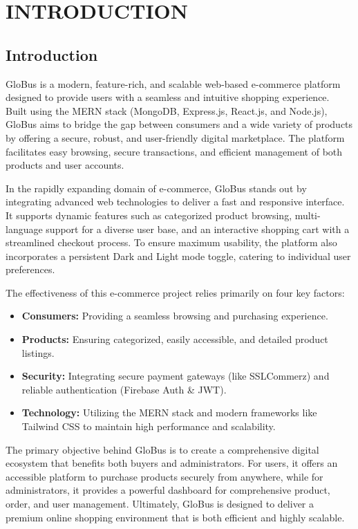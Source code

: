 \chapter{INTRODUCTION}
\section{Introduction}

GloBus is a modern, feature-rich, and scalable web-based e-commerce platform
designed to provide users with a seamless and intuitive shopping experience. Built
using the MERN stack (MongoDB, Express.js, React.js, and Node.js), GloBus aims to
bridge the gap between consumers and a wide variety of products by offering a secure,
robust, and user-friendly digital marketplace. The platform facilitates easy
browsing, secure transactions, and efficient management of both products and
user accounts.

In the rapidly expanding domain of e-commerce, GloBus stands out by integrating advanced
web technologies to deliver a fast and responsive interface. It supports dynamic
features such as categorized product browsing, multi-language support for a diverse
user base, and an interactive shopping cart with a streamlined checkout process.
To ensure maximum usability, the platform also incorporates a persistent Dark
and Light mode toggle, catering to individual user preferences.

The effectiveness of this e-commerce project relies primarily on four key factors:
\begin{itemize}
    \item \textbf{Consumers:} Providing a seamless browsing and purchasing
        experience.

    \item \textbf{Products:} Ensuring categorized, easily accessible, and
        detailed product listings.

    \item \textbf{Security:} Integrating secure payment gateways (like SSLCommerz)
        and reliable authentication (Firebase Auth \& JWT).

    \item \textbf{Technology:} Utilizing the MERN stack and modern frameworks
        like Tailwind CSS to maintain high performance and scalability.
\end{itemize}

The primary objective behind GloBus is to create a comprehensive digital ecosystem
that benefits both buyers and administrators. For users, it offers an accessible
platform to purchase products securely from anywhere, while for administrators, it
provides a powerful dashboard for comprehensive product, order, and user management.
Ultimately, GloBus is designed to deliver a premium online shopping environment that
is both efficient and highly scalable.

